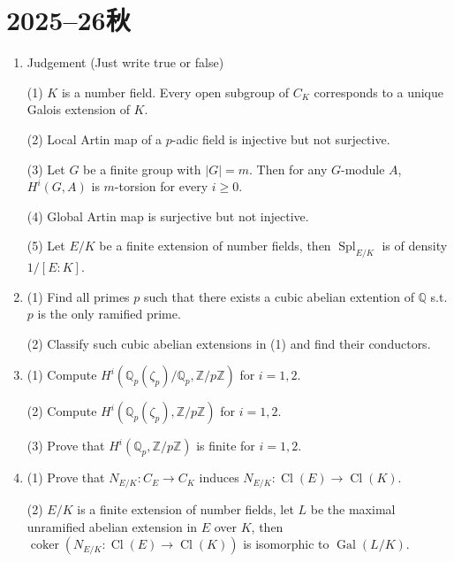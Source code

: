 

\section{2025--26秋}
\begin{enumerate}
\item Judgement (Just write true or false)

(1) $K$ is a number field. Every open subgroup of $C_K$ corresponds to a unique Galois extension of $K$. 

(2) Local Artin map of a $p$-adic field is injective but not surjective. 

(3) Let $G$ be a finite group with $|G|=m$. Then for any $G$-module $A$, $H^i(G,A)$ is $m$-torsion for every $i\geq 0$. 

(4) Global Artin map is surjective but not injective. 

(5) Let $E/K$ be a finite extension of number fields, then $\operatorname{Spl}_{E/K}$ is of density $1/[E:K]$. 

\item 

(1) Find all primes $p$ such that there exists a cubic abelian extention of $\mathbb Q$ s.t. $p$ is the only ramified prime. 

(2) Classify such cubic abelian extensions in (1) and find their conductors. 


\item 

(1) Compute $H^i(\mathbb Q_p(\zeta_p)/\mathbb Q_p, \mathbb Z/p\mathbb Z)$ for $i=1,2$. 

(2) Compute $H^i(\mathbb Q_p(\zeta_p), \mathbb Z/p\mathbb Z)$ for $i=1,2$. 

(3) Prove that $H^i(\mathbb Q_p, \mathbb Z/p\mathbb Z)$ is finite for $i=1,2$. 

\item

(1) Prove that $N_{E/K}: C_E \longrightarrow C_K$ induces $N_{E/K}: \operatorname{Cl}(E) \longrightarrow \operatorname{Cl}(K)$. 

(2) $E/K$ is a finite extension of number fields, let $L$ be the maximal unramified abelian extension in $E$ over $K$, 
then $\operatorname{coker}(N_{E/K}: \operatorname{Cl}(E) \rightarrow \operatorname{Cl}(K))$ is isomorphic to $\operatorname{Gal}(L/K)$.


\end{enumerate}
